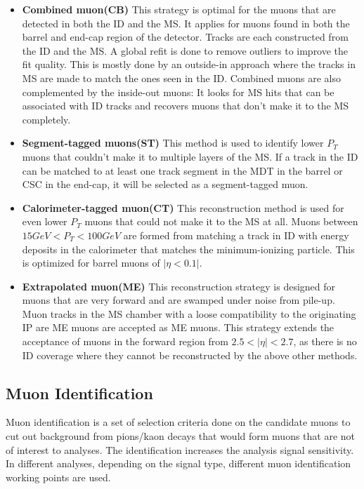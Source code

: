 \begin{itemize}
\item \textbf{Combined muon(CB)}
    This strategy is optimal for the muons that are detected in both the ID and the MS. It applies for muons found in both the barrel and end-cap region of the detector. Tracks are each constructed from the ID and the MS. A global refit is done to remove outliers to improve the fit quality. This is mostly done by an outside-in approach where the tracks in MS are made to match the ones seen in the ID. Combined muons are also complemented by the inside-out muons: It looks for MS hits that can be associated with ID tracks and recovers muons that don't make it to the MS completely.

\item \textbf{Segment-tagged muons(ST)}
This method is used to identify lower $P_{T}$ muons that couldn't make it to multiple layers of the MS. If a track in the ID can be matched to at least one track segment in the MDT in the barrel or CSC in the end-cap, it will be selected as a segment-tagged muon. 

\item \textbf{Calorimeter-tagged muon(CT)}
This reconstruction method is used for even lower $P_{T}$ muons that could not make it to the MS at all. Muons between $15 GeV < P_{T} < 100GeV$ are formed from matching a track in ID with energy deposits in the calorimeter that matches the minimum-ionizing particle. This is optimized for barrel muons of $|\eta <0.1|$. 

\item \textbf{Extrapolated muon(ME)}
    This reconstruction strategy is designed for muons that are very forward and are swamped under noise from pile-up. Muon tracks in the MS chamber with a loose compatibility to the originating IP are ME muons are accepted as ME muons. This strategy extends the acceptance of muons in the forward region from $2.5<|\eta|<2.7$, as there is no ID coverage where they cannot be reconstructed by the above other methods.
\end{itemize}

\subsection{Muon Identification}
Muon identification is a set of selection criteria done on the candidate muons to cut out background from pions/kaon decays that would form muons that are not of interest to analyses. The identification increases the analysis signal sensitivity. In different analyses, depending on the signal type, different muon identification working points are used.

